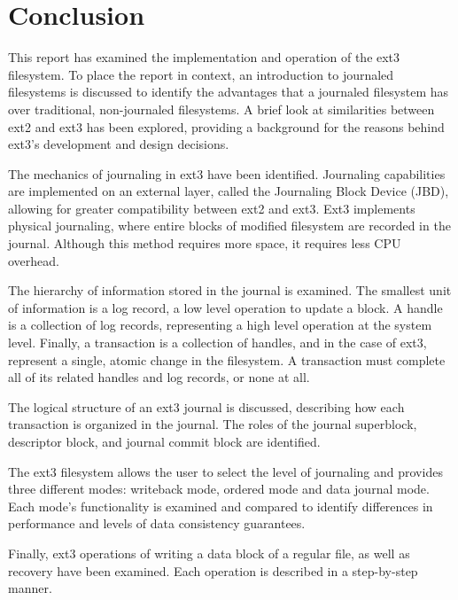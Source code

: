 \section{Conclusion}

This report has examined the implementation and operation of the ext3 filesystem. To place the report in context, an introduction to journaled filesystems is discussed to identify the advantages that a journaled filesystem has over traditional, non-journaled filesystems. A brief look at similarities between ext2 and ext3 has been explored, providing a background for the reasons behind ext3's development and design decisions.

The mechanics of journaling in ext3 have been identified. Journaling capabilities are implemented on an external layer, called the Journaling Block Device (JBD), allowing for greater compatibility between ext2 and ext3. Ext3 implements physical journaling, where entire blocks of modified filesystem are recorded in the journal. Although this method requires more space, it requires less CPU overhead.

The hierarchy of information stored in the journal is examined. The smallest unit of information is a log record, a low level operation to update a block. A handle is a collection of log records, representing a high level operation at the system level. Finally, a transaction is a collection of handles, and in the case of ext3, represent a single, atomic change in the filesystem. A transaction must complete all of its related handles and log records, or none at all.

The logical structure of an ext3 journal is discussed, describing how each transaction is organized in the journal. The roles of the journal superblock, descriptor block, and journal commit block are identified.

The ext3 filesystem allows the user to select the level of journaling and provides three different modes: writeback mode, ordered mode and data journal mode. Each mode's functionality is examined and compared to identify differences in performance and levels of data consistency guarantees.

Finally, ext3 operations of writing a data block of a regular file, as well as recovery have been examined. Each operation is described in a step-by-step manner.